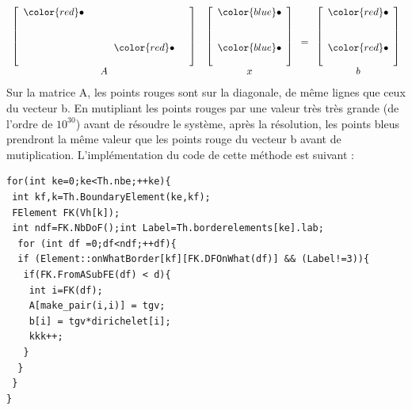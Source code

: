 \documentclass{book}
\begin{document}
\[
\begin{array}{cc}
\left[
\begin{array}{lllll}
{\color{red}\bullet} & & & &\\
 & & & &\\
 & & & &\\
 & & &{\color{red}\bullet} &\\
 & & & &
\end{array}
\right]
\\
A
\end{array}
\begin{array}{cc}
\left[
\begin{array}{lllll}
{\color{blue}\bullet}\\
\\
\\
{\color{blue}\bullet}\\
\\
\end{array}
\right]
\\
x
\end{array}
=
\begin{array}{cc}
\left[
\begin{array}{lllll}
{\color{red}\bullet}\\
\\
\\
{\color{red}\bullet}\\
\\
\end{array}
\right]
\\
b
\end{array}
\]
Sur la matrice A, les points rouges sont sur la diagonale, de même lignes que ceux du vecteur b. En mutipliant les points rouges par une valeur très très grande (de l'ordre de $10^{30}$) avant de résoudre le système, après la résolution, les points bleus prendront la même valeur que les points rouge du vecteur b avant de mutiplication. L'implémentation du code de cette méthode est suivant :
\begin{lstlisting}
for(int ke=0;ke<Th.nbe;++ke){	
 int kf,k=Th.BoundaryElement(ke,kf);
 FElement FK(Vh[k]);
 int ndf=FK.NbDoF();int Label=Th.borderelements[ke].lab;
  for (int df =0;df<ndf;++df){
  if (Element::onWhatBorder[kf][FK.DFOnWhat(df)] && (Label!=3)){
   if(FK.FromASubFE(df) < d){
    int i=FK(df);
    A[make_pair(i,i)] = tgv;
    b[i] = tgv*dirichelet[i];
    kkk++;
   }
  }
 }  
}
\end{lstlisting}
\end{document}
